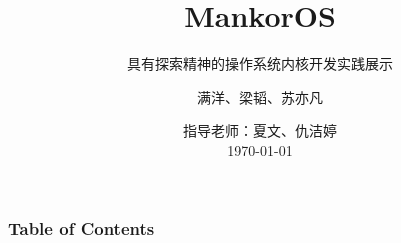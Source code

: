 \documentclass[aspectratio=169]{beamer}
\title{MankorOS}
\subtitle{具有探索精神的操作系统内核开发实践展示}
\author{满洋、梁韬、苏亦凡}
\institute[HITSZ]{哈尔滨工业大学（深圳）}
\date[\today]{ 指导老师：夏文、仇洁婷\\ \vspace{1em} \today}
\begin{document}
\frame{\titlepage}




\begin{frame}
    \frametitle{Table of Contents}
    \tableofcontents
\end{frame}







\end{document}
